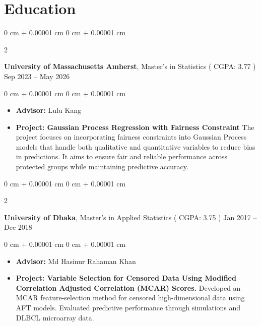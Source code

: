 \documentclass[10pt, letterpaper]{article}
\newenvironment{highlights}{
    \begin{itemize}[
        topsep=0.10 cm,
        parsep=0.10 cm,
        partopsep=0pt,
        itemsep=0pt,
        leftmargin=0 cm + 10pt
    ]
}{
    \end{itemize}
} %
\newenvironment{onecolentry}{
    \begin{adjustwidth}{
        0 cm + 0.00001 cm
    }{
        0 cm + 0.00001 cm
    }
}{
    \end{adjustwidth}
} %
\newenvironment{twocolentry}[2][]{
    \onecolentry
    \def\secondColumn{#2}
    \setcolumnwidth{\fill, 4.5 cm}
    \begin{paracol}{2}
}{
    \switchcolumn \raggedleft \secondColumn
    \end{paracol}
    \endonecolentry
} %
\begin{document}
        \vspace{0.2 cm}
    \section{Education}

        \begin{twocolentry}{
            Sep 2023 – May 2026
        }
            \textbf{University of Massachusetts Amherst}, Master's in Statistics ( CGPA: 3.77 )\end{twocolentry}

        \vspace{0.10 cm}
        \begin{onecolentry}
            \begin{highlights}
                \item \textbf{Advisor:} Lulu Kang
                \item \textbf{Project: Gaussian Process Regression with Fairness Constraint} The project focuses on incorporating fairness constraints into Gaussian Process models that handle both qualitative and quantitative variables to reduce bias in predictions. It aims to ensure fair and reliable performance across protected groups while maintaining predictive accuracy.
            \end{highlights}
        \end{onecolentry}

    \vspace{0.20 cm}
    \begin{twocolentry}{
            Jan 2017 – Dec 2018
        }
            \textbf{University of Dhaka}, Master's in Applied Statistics ( CGPA: 3.75 )\end{twocolentry}
        \vspace{0.10 cm}
        \begin{onecolentry}
            \begin{highlights}
                \item \textbf{Advisor:} Md Hasinur Rahaman Khan
                \item \textbf{Project: Variable Selection for Censored Data Using Modified Correlation Adjusted Correlation (MCAR) Scores.} Developed an MCAR feature-selection method for censored high-dimensional data using AFT models. Evaluated predictive performance through simulations and DLBCL microarray data.
            \end{highlights}
        \end{onecolentry}
\end{document}
